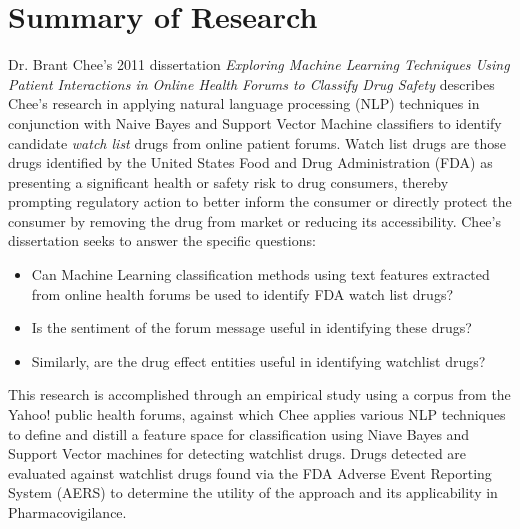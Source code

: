 \documentclass[twoside,11pt]{article}
\begin{document}
\section{Summary of Research}
Dr. Brant Chee's 2011 dissertation \textit{Exploring Machine Learning Techniques Using
Patient Interactions in Online Health Forums to Classify Drug Safety} describes
Chee's research in applying natural language processing (NLP) techniques in conjunction with Naive Bayes and Support Vector Machine classifiers to identify candidate \textit{watch list} drugs from online patient forums. Watch list drugs are those drugs identified by the United States Food and Drug Administration (FDA) as presenting a significant health or safety risk to drug consumers, thereby prompting regulatory action to better inform the consumer or directly protect the consumer by removing the drug from market or reducing its accessibility. Chee's dissertation seeks to answer the specific questions:
\begin{itemize}
  \item Can Machine Learning classification methods using text features extracted from online health forums be used to identify FDA watch list drugs?
  \item Is the sentiment of the forum message useful in identifying these drugs?
  \item Similarly, are the drug effect entities useful in identifying watchlist drugs?
\end{itemize}

This research is accomplished through an empirical study using a corpus from the
Yahoo! public health forums, against which Chee applies various NLP techniques
to define and distill a feature space for classification using Niave Bayes and
Support Vector machines for detecting watchlist drugs. Drugs detected are
evaluated against watchlist drugs found via the FDA Adverse Event Reporting System (AERS) to determine the utility of the approach and its applicability in Pharmacovigilance.
\end{document}
